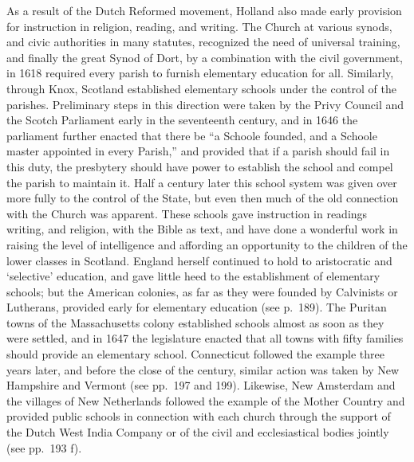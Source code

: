 \documentclass[
]{book}
\begin{document}
As a result of the Dutch Reformed movement, Holland also made early provision for instruction in religion, reading, and writing. The Church at various synods, and civic authorities in many statutes, recognized the need of universal training, and finally the great Synod of Dort, by a combination with the civil government, in 1618 required every parish to furnish elementary education for all. Similarly, through Knox, Scotland established elementary schools under the control of the parishes. Preliminary steps in this direction were taken by the Privy Council and the Scotch Parliament early in the seventeenth century, and in 1646 the parliament further enacted that there be ``a Schoole founded, and a Schoole master appointed in every Parish,'' and provided that if a parish should fail in this duty, the presbytery should have power to establish the school and compel the parish to maintain it. Half a century later this school system was given over more fully to the control of the State, but even then much of the old connection with the Church was apparent. These schools gave instruction in readings writing, and religion, with the Bible as text, and have done a wonderful work in raising the level of intelligence and affording an opportunity to the children of the lower classes in Scotland. England herself continued to hold to aristocratic and `selective' education, and gave little heed to the establishment of elementary schools; but the American colonies, as far as they were founded by Calvinists or Lutherans, provided early for elementary education (see p.~189). The Puritan towns of the Massachusetts colony established schools almost as soon as they were settled, and in 1647 the legislature enacted that all towns with fifty families should provide an elementary school. Connecticut followed the example three years later, and before the close of the century, similar action was taken by New Hampshire and Vermont (see pp.~197 and 199). Likewise, New Amsterdam and the villages of New Netherlands followed the example of the Mother Country and provided public schools in connection with each church through the support of the Dutch West India Company or of the civil and ecclesiastical bodies jointly (see pp.~193 f).
\end{document}
